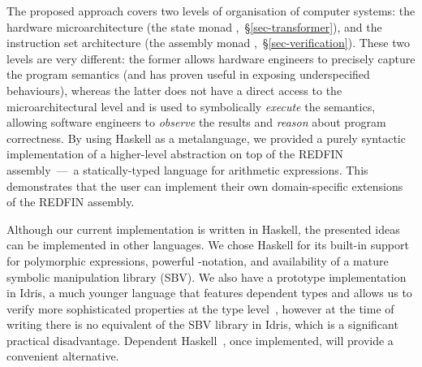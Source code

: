 



The proposed approach covers two levels of organisation of computer systems: the
hardware microarchitecture (the state monad ,~\S\ref{sec-transformer}),
and the instruction set architecture (the assembly monad
,~\S\ref{sec-verification}). These two levels are very different: the
former allows hardware engineers to precisely capture the program semantics (and
has proven useful in exposing underspecified behaviours), whereas the latter does
not have a direct access to the microarchitectural level and is used to
symbolically \emph{execute} the semantics, allowing software engineers to
\emph{observe} the results and \emph{reason} about program correctness.
By using Haskell as a metalanguage, we provided a purely syntactic implementation
of a higher-level abstraction on top of the REDFIN assembly~---~a statically-typed
language for arithmetic expressions. This demonstrates that the user
can implement their own domain-specific
extensions of the REDFIN assembly.

Although our current implementation is written in Haskell, the presented ideas
can be implemented in other languages. We chose Haskell for its built-in
support for polymorphic expressions, powerful -notation, and availability
of a mature symbolic manipulation library (SBV). We also have a prototype
implementation in Idris, a much younger language that features dependent
types and allows us to verify more sophisticated properties at the type
level~\cite{JFP:9060502}, however at the time of writing there is no equivalent
of the SBV library in Idris, which is a significant practical disadvantage.
Dependent Haskell~\cite{weirich2017dependent}, once implemented, will provide
a convenient alternative.

